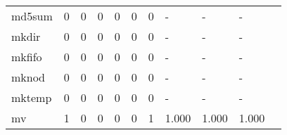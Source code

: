 \begin{longtable}{lp{1.2cm}p{1.2cm}p{1.2cm}p{1.2cm}p{1.2cm}p{1.2cm}p{1.2cm}p{1.2cm}p{1.2cm}p{1.2cm}}
md5sum    &                                     0 &                                                  0 &                                                  0 &                                                  0 &                                                  0 &                                                  0 &                                             - &                                                  - &                                                  - \\
mkdir     &                                     0 &                                                  0 &                                                  0 &                                                  0 &                                                  0 &                                                  0 &                                             - &                                                  - &                                                  - \\
mkfifo    &                                     0 &                                                  0 &                                                  0 &                                                  0 &                                                  0 &                                                  0 &                                             - &                                                  - &                                                  - \\
mknod     &                                     0 &                                                  0 &                                                  0 &                                                  0 &                                                  0 &                                                  0 &                                             - &                                                  - &                                                  - \\
mktemp    &                                     0 &                                                  0 &                                                  0 &                                                  0 &                                                  0 &                                                  0 &                                             - &                                                  - &                                                  - \\
mv        &                                     1 &                                                  0 &                                                  0 &                                                  0 &                                                  0 &                                                  1 &                                         1.000 &                                              1.000 &                                              1.000 \\

\end{longtable}
